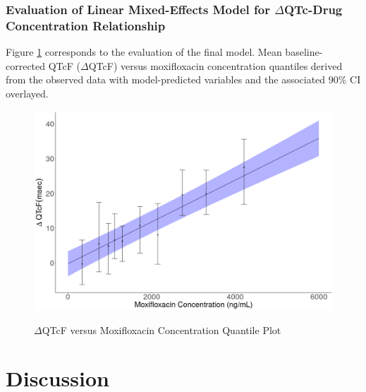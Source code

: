 \documentclass[
]{article}
\begin{document}
\hypertarget{evaluation-of-linear-mixed-effects-model-for-deltaqtc-drug-concentration-relationship}{%
\subsubsection{\texorpdfstring{Evaluation of Linear Mixed-Effects Model
for \(\Delta\)QTc-Drug Concentration
Relationship}{Evaluation of Linear Mixed-Effects Model for \textbackslash DeltaQTc-Drug Concentration Relationship}}\label{evaluation-of-linear-mixed-effects-model-for-deltaqtc-drug-concentration-relationship}}

Figure \ref{fig:DQTCquantile} corresponds to the evaluation of the final
model. Mean baseline-corrected QTcF (\(\Delta\)QTcF) versus moxifloxacin
concentration quantiles derived from the observed data with
model-predicted variables and the associated 90\% CI overlayed.

\begin{figure}[H]
\caption{$\Delta$QTcF versus Moxifloxacin Concentration Quantile Plot} 
\includegraphics[width=\textwidth]{../Report/Figures/DQTCquantile.png}
\label{fig:DQTCquantile}
\end{figure}

\hypertarget{discussion}{%
\section{Discussion}\label{discussion}}
\end{document}
